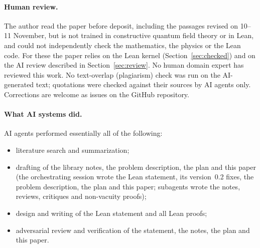 \documentclass[11pt]{article}
\theoremstyle{definition}
\theoremstyle{remark}
\begin{document}
\paragraph{Human review.}
The author read the paper before deposit, including the passages revised on 10--11 November, but is
not trained in constructive quantum field theory or
in Lean, and could not independently check the mathematics, the physics or the Lean code. For these
the paper relies on the Lean kernel (Section~\ref{sec:checked}) and on the AI review described in
Section~\ref{sec:review}. No human domain expert has reviewed this work. No text-overlap
(plagiarism) check was run on the AI-generated text; quotations were checked against their sources
by AI agents only. Corrections are welcome as issues on the GitHub repository.

\paragraph{What AI systems did.}
AI agents performed essentially all of the following:
\begin{itemize}[leftmargin=*]
\item literature search and summarization;
\item drafting of the library notes, the problem description, the plan and this paper (the
  orchestrating session wrote the Lean statement, its version~0.2 fixes, the problem description,
  the plan and this paper; subagents wrote the notes, reviews, critiques and non-vacuity proofs);
\item design and writing of the Lean statement and all Lean proofs;
\item adversarial review and verification of the statement, the notes, the plan and this paper.
\end{itemize}
\end{document}
